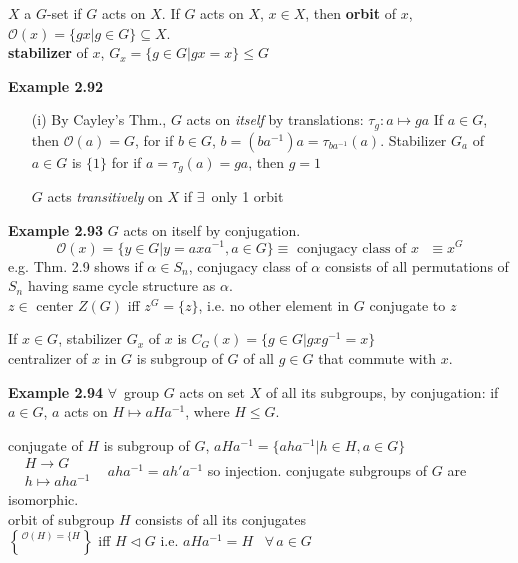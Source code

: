 \documentclass[twoside,landscape]{amsart}
\theoremstyle{plain}
\theoremstyle{definition}
\theoremstyle{remark}
\begin{document}
\begin{multicols*}{2}
$X$ a $G$-set if $G$ acts on $X$.  If $G$ acts on $X$, $x\in X$, then \textbf{orbit} of $x$, $\mathcal{O}(x) = \lbrace gx | g\in G \rbrace \subseteq X$.  \\
\textbf{stabilizer} of $x$, $G_x = \lbrace g \in G|gx = x \rbrace \leq G$

\textbf{Example 2.92} 
\begin{enumerate}
\item[(i)] By Cayley's Thm., $G$ acts on \emph{itself} by translations: $\tau_g: a\mapsto ga$
If $a\in G$, then $\mathcal{O}(a) = G$, for if $b\in G$, $b=(ba^{-1})a = \tau_{ba^{-1}}(a)$.
Stabilizer $G_a$ of $a\in G$ is $\lbrace 1 \rbrace$ for if $a = \tau_g(a) = ga$, then $g=1$

$G$ acts \emph{transitively} on $X$ if $\exists \, $ only 1 orbit
\end{enumerate}

\textbf{Example 2.93} $G$ acts on itself by conjugation. 
\[
\mathcal{O}(x) = \lbrace y \in G | y = axa^{-1}, a \in G \rbrace \equiv \text{ conjugacy class of $x$ } \equiv x^G
\]
e.g. Thm. 2.9 shows if $\alpha \in S_n$, conjugacy class of $\alpha$ consists of all permutations of $S_n$ having same cycle structure as $\alpha$. \\
$z\in $ center $Z(G)$ iff $z^G = \lbrace z \rbrace$, i.e. no other element in $G$ conjugate to $z$

If $x\in G$, stabilizer $G_x$ of $x$ is $C_G(x) = \lbrace g\in G | gxg^{-1} = x\rbrace$ \\
centralizer of $x$ in $G$ is subgroup of $G$ of all $g\in G$ that commute with $x$.  

\textbf{Example 2.94} $\forall \, $ group $G$ acts on set $X$ of all its subgroups, by conjugation: if $a\in G$, $a$ acts on $H \mapsto aHa^{-1}$, where $H \leq G$.  

conjugate of $H$ is subgroup of $G$, $aHa^{-1} = \lbrace aha^{-1} | h \in H, a\in G \rbrace$ \\
$\begin{aligned}
  & H \to G \\
  & h \mapsto aha^{-1} \end{aligned}$ \quad \quad \, $aha^{-1} = ah' a^{-1}$ so injection.  conjugate subgroups of $G$ are isomorphic.   \\


orbit of subgroup $H$ consists of all its conjugates \\
\quad $\mathcal{O}(H) = \lbrace H \brace $ iff $H \lhd G$ i.e. $aHa^{-1}=H $ \quad \, $ \forall \, a \in G$ \\


\end{multicols*}
\end{document}
